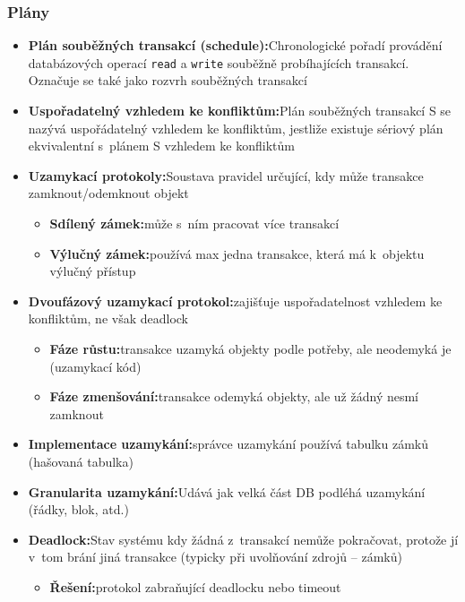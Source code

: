 \documentclass[a4paper,10pt]{article}
\newcommand{\pojem}[2]{\item \textbf{#1:}\quad #2}
\begin{document}
			\subsubsection{Plány}
				\begin{itemize}
					\pojem{Plán souběžných transakcí (schedule)}{Chronologické pořadí provádění databázových operací \texttt{read} a \texttt{write} souběžně probíhajících transakcí. Označuje se také jako rozvrh souběžných transakcí}

					\pojem{Uspořadatelný vzhledem ke konfliktům}{Plán souběžných transakcí S se nazývá uspořádatelný vzhledem ke konfliktům, jestliže existuje sériový plán ekvivalentní s~plánem S vzhledem ke konfliktům}

					\pojem{Uzamykací protokoly}{Soustava pravidel určující, kdy může transakce zamknout/odemknout objekt}
					\begin{itemize}
						\pojem{Sdílený zámek}{může s~ním pracovat více transakcí}
						\pojem{Výlučný zámek}{používá max jedna transakce, která má k~objektu výlučný přístup}
					\end{itemize}

					\pojem{Dvoufázový uzamykací protokol}{zajišťuje uspořadatelnost vzhledem ke konfliktům, ne však deadlock}
					\begin{itemize}
						\pojem{Fáze růstu}{transakce uzamyká objekty podle potřeby, ale neodemyká je (uzamykací kód)}
						\pojem{Fáze zmenšování}{transakce odemyká objekty, ale už žádný nesmí zamknout}
					\end{itemize}

					\pojem{Implementace uzamykání}{správce uzamykání používá tabulku zámků (hašovaná tabulka)}

					\pojem{Granularita uzamykání}{Udává jak velká část DB podléhá uzamykání (řádky, blok, atd.)}

					\pojem{Deadlock}{Stav systému kdy žádná z~transakcí nemůže pokračovat, protože jí v~tom brání jiná transakce (typicky při uvolňování zdrojů -- zámků)}
					\begin{itemize}
						\pojem{Řešení}{protokol zabraňující deadlocku nebo timeout}
					\end{itemize}
				\end{itemize}
\end{document}
